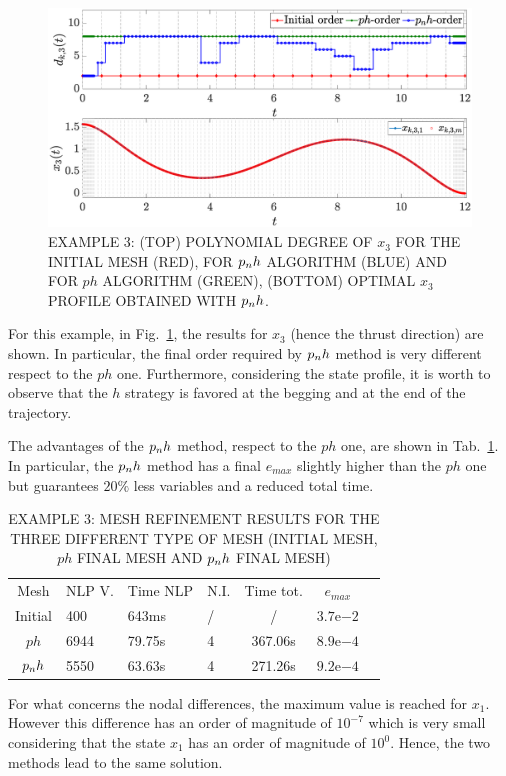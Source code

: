 \begin{figure}[t]
	\centering
	\includegraphics[trim={1cm 0cm 2cm 0cm},clip,width=1.\linewidth]{Img/pnh1_free}
	\caption{EXAMPLE 3: (TOP) POLYNOMIAL DEGREE OF $x_{3}$ FOR THE INITIAL MESH (RED), FOR $p_{n}h$ ALGORITHM (BLUE) AND FOR $ph$ ALGORITHM (GREEN), (BOTTOM) OPTIMAL $x_3$ PROFILE OBTAINED WITH $p_{n}h$. }
	\label{fig:pnh1free}
\end{figure}
For this example,  in Fig.~\ref{fig:pnh1free}, the results for $x_3$ (hence the thrust direction) are shown. In particular, the final order required by $p_{n}h$ method is very different respect to the $ph$ one. Furthermore, considering the state profile, it is worth to observe that the $h$ strategy is favored at the begging and at the end of the trajectory.

The advantages of the $p_{n}h$ method, respect to the $ph$ one, are shown in Tab.~\ref{tab:tablefree}. In particular, the $p_{n}h$ method has a final $e_{max}$ slightly higher than the $ph$ one but guarantees $20\%$ less variables and a reduced total time.
\begin{table}[t]
	\caption{EXAMPLE 3: MESH REFINEMENT RESULTS FOR THE THREE DIFFERENT TYPE OF MESH (INITIAL MESH, $ph$ FINAL MESH AND $p_{n}h$ FINAL MESH)}
	\begin{center}
		\label{tab:tablefree}
		\begin{tabular}{c l l l c c c}
			& & \\ %
			\hline
			Mesh & NLP V. & Time NLP & N.I. & Time tot. & $e_{max}$ \\
			\hline
			Initial & 400 & 643ms & / & / &  $3.7\mathrm{e}{-2}$\\
			$ph$  & 6944 & 79.75s & 4 & 367.06s & $8.9\mathrm{e}{-4}$ \\
			$p_{n}h$ & 5550 & 63.63s & 4 & 271.26s & $9.2\mathrm{e}{-4}$ \\
			\hline
		\end{tabular}
	\end{center}
\end{table}
For what concerns the nodal differences, the maximum value is reached for $x_1$. However this difference has an order of magnitude of $10^{-7}$ which is very small considering that the state $x_1$ has an order of magnitude of $10^0$. Hence, the two methods lead to the same solution.

